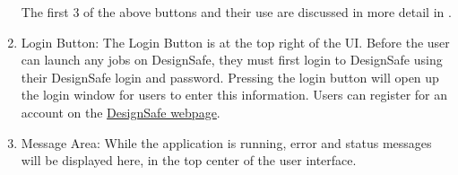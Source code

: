 \begin{enumerate}
The first 3 of the above buttons and their use are discussed in more detail in .

\item Login Button: The Login Button is at the top right of the UI. Before the user can launch any jobs on DesignSafe, they must
  first login to DesignSafe using their DesignSafe login and
  password. Pressing the login button will open up the login window
  for users to enter this information. Users can register for an
  account on
  the \href{https://www.designsafe-ci.org/account/register/}{DesignSafe
  webpage}.

\item Message Area: While the application is running, error and status messages will be displayed here, in the top center of the user interface.

\end{enumerate}
